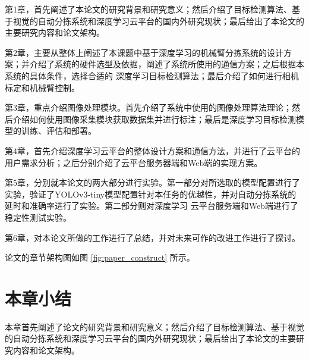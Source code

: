 第1章，首先阐述了本论文的研究背景和研究意义；然后介绍了目标检测算法、基于视觉的自动分拣系统和深度学习云平台的国内外研究现状；最后给出了本论文的主要研究内容和论文架构。

第2章，主要从整体上阐述了本课题中基于深度学习的机械臂分拣系统的设计方案；并介绍了系统的硬件选型及依据，阐述了系统所使用的通信方案；之后根据本系统的具体条件，选择合适的
深度学习目标检测算法；最后介绍了如何进行相机标定和机械臂控制。

第3章，重点介绍图像处理模块。首先介绍了系统中使用的图像处理算法理论；然后介绍如何使用图像采集模块获取数据集并进行标注；最后是深度学习目标检测模型的训练、评估和部署。

第4章，首先介绍深度学习云平台的整体设计方案和通信方法，并进行了云平台的用户需求分析；之后分别介绍了云平台服务器端和Web端的实现方案。

第5章，分别就本论文的两大部分进行实验。第一部分对所选取的模型配置进行了实验，验证了YOLOv3-tiny模型配置针对本任务的优越性，并对自动分拣系统的延时和准确率进行了实验。第二部分则对深度学习
云平台服务端和Web端进行了稳定性测试实验。

第6章，对本论文所做的工作进行了总结，并对未来可作的改进工作进行了探讨。

论文的章节架构图如图    \ref{fig:paper_construct} 所示。

\section{本章小结}
本章首先阐述了论文的研究背景和研究意义；然后介绍了目标检测算法、基于视觉的自动分拣系统和深度学习云平台的国内外研究现状；最后给出了本论文的主要研究内容和论文架构。